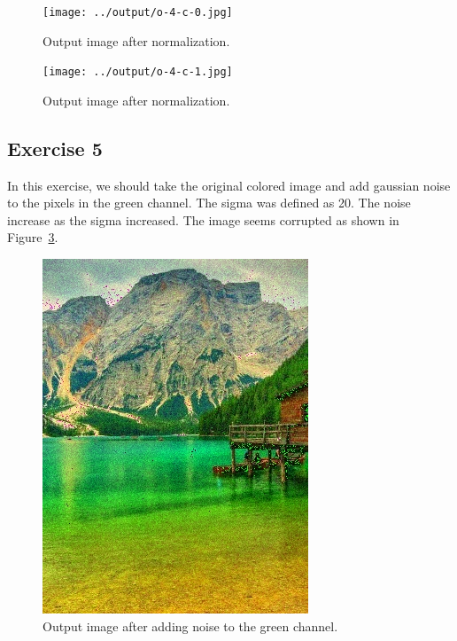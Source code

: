 \documentclass[]{IEEEtran}
\begin{document}
  \begin{figure}[!h]
    \centering
    \texttt{[image: ../output/o-4-c-0.jpg]}
    \caption{Output image after normalization.}
    \label{fig:0-4-c-0}
  \end{figure}

  \begin{figure}[!h]
    \centering
    \texttt{[image: ../output/o-4-c-1.jpg]}
    \caption{Output image after normalization.}
    \label{fig:0-4-c-1}
  \end{figure}


  \subsection{Exercise 5}
  
  In this exercise, we should take the original colored image and add gaussian noise to the pixels in the green channel. The sigma was defined as 20. The noise increase as the sigma increased. The image seems corrupted as shown in Figure~\ref{fig:o-5-a-0}.
  
  \begin{figure}[!h]
    \centering
    \includegraphics[width=0.8\hsize]{../output/o-5-a-0.jpg}
    \caption{Output image after adding noise to the green channel.}
    \label{fig:o-5-a-0}
  \end{figure}
  
\end{document}
